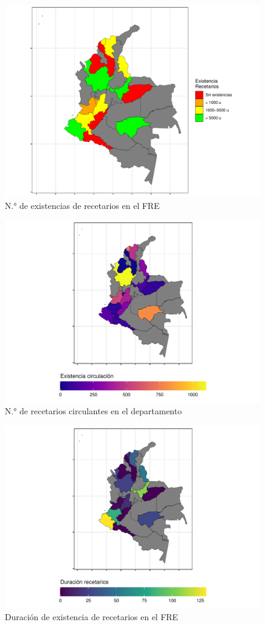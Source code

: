 \documentclass[
]{book}
\begin{document}
\begin{figure}
\includegraphics[width=0.85\linewidth]{InformeFinal_files/figure-latex/existenciasRecetarios-1} \caption{N.° de existencias de recetarios en el FRE}\label{fig:existenciasRecetarios}
\end{figure}

\begin{figure}
\includegraphics[width=0.85\linewidth]{InformeFinal_files/figure-latex/existenciasRecetarios2-1} \caption{N.° de recetarios circulantes en el departamento}\label{fig:existenciasRecetarios2}
\end{figure}

\begin{figure}
\includegraphics[width=0.85\linewidth]{InformeFinal_files/figure-latex/existenciaRecetarios3-1} \caption{Duración de existencia de recetarios en el FRE}\label{fig:existenciaRecetarios3}
\end{figure}
\end{document}

